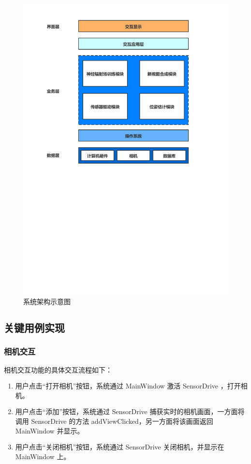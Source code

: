 \begin{figure}[htbp]
	\centering
	\includegraphics[width=0.75\linewidth]{figures/system_design_revised.pdf}
	\caption{系统架构示意图}
	\label{fig:symtem_design}
\end{figure}

\subsection{关键用例实现}
\subsubsection{相机交互}
相机交互功能的具体交互流程如下：
\begin{enumerate}
	\item 用户点击“打开相机”按钮，系统通过 MainWindow 激活 SensorDrive ，打开相机。
	
	\item 用户点击“添加”按钮，系统通过 SensorDrive 捕获实时的相机画面，一方面将调用 SensorDrive 的方法 addViewClicked，另一方面将该画面返回 MainWindow 并显示。
	\item 用户点击“关闭相机”按钮，系统通过 SensorDrive 关闭相机，并显示在 MainWindow 上。 
\end{enumerate}

